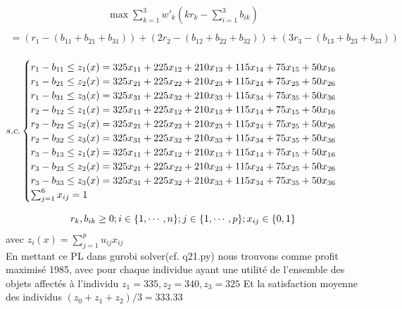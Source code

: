 \documentclass[16pt, a4paper]{article}
\begin{document}
\begin{flushleft}
\begin{justify}
\begin{align*}
    \max \sum_{k=1}^3 w'_k(kr_k- \sum_{i=1}^3 b_{ik})\\ 
\end{align*}
\begin{align*}
    = (r_1 - (b_{11} + b_{21} + b_{31})) + (2r_2 - (b_{12} + b_{22} + b_{32})) + (3r_3 - (b_{13} + b_{23} + b_{33}))\\
\end{align*}

\begin{center}
    \begin{math}
        s.c.\begin{cases}
            r_1 - b_{11} \leq z_1(x) = 325x_{11} +225x_{12}+210x_{13}+115x_{14} +75x_{15}+50x_{16} \\
            r_1 - b_{21} \leq z_2(x) = 325x_{21} +225x_{22}+210x_{23}+115x_{24} +75x_{25}+50x_{26} \\
            r_1 - b_{31} \leq z_3(x) = 325x_{31} +225x_{32}+210x_{33}+115x_{34} +75x_{35}+50x_{36} \\
            r_2 - b_{12} \leq z_1(x) = 325x_{11} +225x_{12}+210x_{13}+115x_{14} +75x_{15}+50x_{16} \\
            r_2 - b_{22} \leq z_2(x) = 325x_{21} +225x_{22}+210x_{23}+115x_{24} +75x_{25}+50x_{26}  \\
            r_2 - b_{32} \leq z_3(x) = 325x_{31} +225x_{32}+210x_{33}+115x_{34} +75x_{35}+50x_{36} \\
            r_3 - b_{13} \leq z_1(x) = 325x_{11} +225x_{12}+210x_{13}+115x_{14} +75x_{15}+50x_{16} \\
            r_3 - b_{23} \leq z_2(x) =325x_{21} +225x_{22}+210x_{23}+115x_{24} +75x_{25}+50x_{26}  \\
            r_3 - b_{33} \leq z_3(x) = 325x_{31} +225x_{32}+210x_{33}+115x_{34} +75x_{35}+50x_{36} \\
            \sum_{j = 1}^6 x_{ij} = 1
       
        
        \end{cases}\\
    \end{math}
\end{center}
$$r_{k}, b_{ik} \geq 0 ; i\in \{1,\cdots, n\} ; j \in \{1,\cdots,p\} ; x_{ij} \in \{0,1\}\\$$
avec $z_i(x) = \sum_{j=1}^p u_{ij}x_{ij}$ \\


En mettant ce PL dans gurobi solver(cf. q21.py) nous trouvons comme profit maximisé 1985, avec pour chaque individue ayant une utilité de l’ensemble des objets affectés à l’individu $z_1 = 335 , z_2 = 340, z_3 = 325$ 
Et la satisfaction moyenne des individus $ (z_0  + z_1 + z_2)/3= 333.33$\\



\end{justify}
\end{flushleft}
\end{document}
